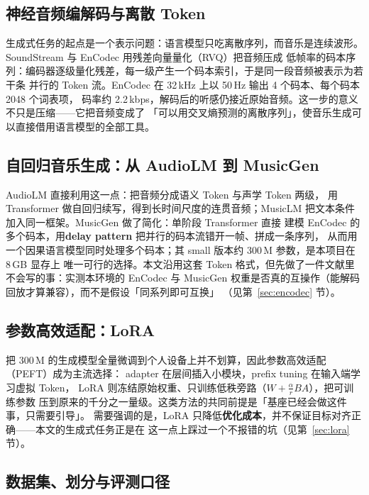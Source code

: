 \documentclass[UTF8,10pt,a4paper]{ctexart}
\begin{document}
\subsection{神经音频编解码与离散 Token}\label{sec:rw-token}

生成式任务的起点是一个表示问题：语言模型只吃离散序列，而音乐是连续波形。SoundStream 与
EnCodec\cite{zeghidour2021soundstream,defossez2023encodec} 用残差向量量化（RVQ）把音频压成
低帧率的码本序列：编码器逐级量化残差，每一级产生一个码本索引，于是同一段音频被表示为若干条
并行的 Token 流。EnCodec 在 32\,kHz 上以 50\,Hz 输出 4 个码本、每个码本 2048 个词表项，
码率约 2.2\,kbps，解码后的听感仍接近原始音频。这一步的意义不只是压缩——它把音频变成了
「可以用交叉熵预测的离散序列」，使音乐生成可以直接借用语言模型的全部工具。

\subsection{自回归音乐生成：从 AudioLM 到 MusicGen}\label{sec:rw-gen}

AudioLM\cite{borsos2023audiolm} 直接利用这一点：把音频分成语义 Token 与声学 Token 两级，
用 Transformer 做自回归续写，得到长时间尺度的连贯音频；MusicLM\cite{agostinelli2023musiclm}
把文本条件加入同一框架。MusicGen\cite{copet2023musicgen} 做了简化：单阶段 Transformer 直接
建模 EnCodec 的多个码本，用\textbf{delay pattern} 把并行的码本流错开一帧、拼成一条序列，
从而用一个因果语言模型同时处理多个码本；其 small 版本约 300\,M 参数，是本项目在 8\,GB 显存上
唯一可行的选择。本文沿用这套 Token 格式，但先做了一件文献里不会写的事：实测本环境的 EnCodec
与 MusicGen 权重是否真的互操作（能解码回放才算兼容），而不是假设「同系列即可互换」
（见第~\ref{sec:encodec} 节）。

\subsection{参数高效适配：LoRA}\label{sec:rw-lora}

把 300\,M 的生成模型全量微调到个人设备上并不划算，因此参数高效适配（PEFT）成为主流选择：
adapter 在层间插入小模块\cite{houlsby2019adapters}，prefix tuning 在输入端学习虚拟 Token，
LoRA\cite{hu2021lora} 则冻结原始权重、只训练低秩旁路（$W+\frac{\alpha}{r}BA$），把可训练参数
压到原来的千分之一量级。这类方法的共同前提是「基座已经会做这件事，只需要引导」。
需要强调的是，LoRA 只降低\textbf{优化成本}，并不保证目标对齐正确——本文的生成式任务正是在
这一点上踩过一个不报错的坑（见第~\ref{sec:lora} 节）。

\subsection{数据集、划分与评测口径}\label{sec:rw-eval}
\end{document}
